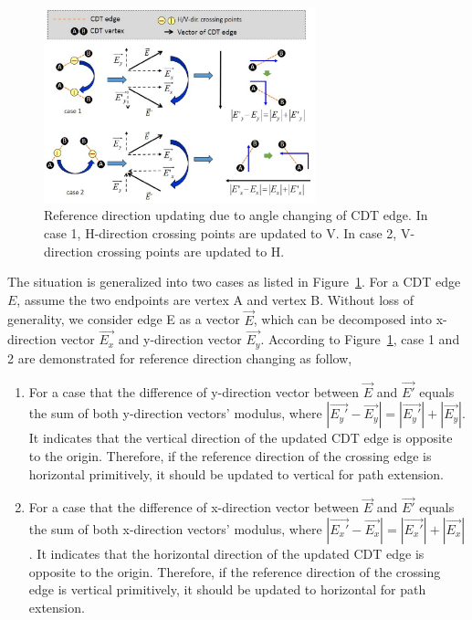        
      \begin{figure}[t]
        \begin{center}
          \includegraphics[width=0.7\textwidth]{Fig/Chapter4/refdir2.eps}
          \caption{Reference direction updating due to angle changing of CDT edge.
           In case 1, H-direction crossing points are updated to V. 
             In case 2, V-direction crossing points are updated to H.}
          \label{fig:refdir}
        \end{center}
      \end{figure}

      The situation is generalized into two cases as listed in Figure~\ref{fig:refdir}.
      For a CDT edge $E$, assume the two endpoints are vertex A and vertex B. Without loss of generality, we consider edge E as a vector $\overrightarrow{E}$, which can be decomposed into x-direction vector $\overrightarrow{E_x}$ and y-direction vector $\overrightarrow{E_y}$. According to Figure~\ref{fig:refdir}, case 1 and 2 are demonstrated for reference direction changing as follow, 


      \begin{enumerate}
        \item For a case that the difference of y-direction vector between $\overrightarrow{E}$ and $\overrightarrow{E'}$ equals the sum of both y-direction vectors' modulus, where $|\overrightarrow{E_y'} - \overrightarrow{E_y}|=|\overrightarrow{E_y'}|+|\overrightarrow{E_y}|$. It indicates that the vertical direction of the updated CDT edge is opposite to the origin. Therefore, if the reference direction of the crossing edge is horizontal primitively, it should be updated to vertical for path extension.
        \item For a case that the difference of x-direction vector between $\overrightarrow{E}$ and $\overrightarrow{E'}$ equals the sum of both x-direction vectors' modulus, where $|\overrightarrow{E_x'} - \overrightarrow{E_x}|=|\overrightarrow{E_x'}|+|\overrightarrow{E_x}|$. It indicates that the horizontal direction of the updated CDT edge is opposite to the origin. Therefore, if the reference direction of the crossing edge is vertical primitively, it should be updated to horizontal for path extension.
      \end{enumerate}

